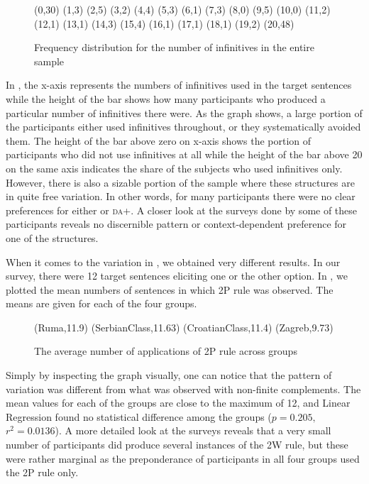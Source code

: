 \documentclass[output=paper,modfonts,newtxmath,hidelinks,]{langscibook}
\begin{document}
\begin{figure}[h]
\footnotesize
\textsf{
%
{
(0,30) (1,3) (2,5) (3,2) (4,4) (5,3) (6,1) (7,3) (8,0) (9,5) (10,0) (11,2) (12,1) (13,1) (14,3) (15,4) (16,1) (17,1) (18,1) (19,2) (20,48)
}}
\caption{Frequency distribution for the number of infinitives in the entire sample}\label{7:fig:key:2}
\end{figure}


In , the x-axis represents the numbers of infinitives used in the target sentences while the height of the bar shows how many participants who produced a particular number of infinitives there were. As the graph shows, a large portion of the participants either used infinitives throughout, or they systematically avoided them. The height of the bar above zero on x-axis shows the portion of participants who did not use infinitives at all while the height of the bar above 20 on the same axis indicates the share of the subjects who used infinitives only. However, there is also a sizable portion of the sample where these structures are in quite free variation. In other words, for many participants there were no clear preferences for either  or \textsc{da}+. A closer look at the surveys done by some of these participants reveals no discernible pattern or context-dependent preference for one of the structures. 

When it comes to the variation in , we obtained very different results. In our survey, there were 12 target sentences eliciting one or the other  option. In , we plotted the mean numbers of sentences in which 2P rule was observed. The means are given for each of the four groups.

  
\begin{figure}[h]
\footnotesize
\textsf{
%
{
(Ruma,11.9)
(SerbianClass,11.63)
(CroatianClass,11.4)
(Zagreb,9.73)
}}
\caption{The average number of applications of 2P rule across groups}\label{7:fig:key:3}
\end{figure}

\largerpage%
Simply by inspecting the graph visually, one can notice that the pattern of variation was different from what was observed with non-finite complements. The mean values for each of the groups are close to the maximum of 12, and Linear Regression found no statistical difference among the groups ($p=0.205,$ $r^2 = 0.0136$). A more detailed look at the surveys reveals that a very small number of participants did produce several instances of the 2W rule, but these were rather marginal as the preponderance of participants in all four groups used the 2P rule only. 
\end{document}
